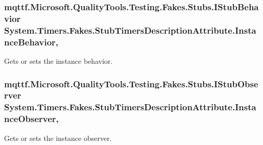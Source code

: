 \hypertarget{class_system_1_1_timers_1_1_fakes_1_1_stub_timers_description_attribute_ace5a66800ab451876edeee69c8747f80}{
\subsubsection[{Instance\-Behavior}]{\setlength{\rightskip}{0pt plus 5cm}mqttf.\-Microsoft.\-Quality\-Tools.\-Testing.\-Fakes.\-Stubs.\-I\-Stub\-Behavior System.\-Timers.\-Fakes.\-Stub\-Timers\-Description\-Attribute.\-Instance\-Behavior\hspace{0.3cm}{\ttfamily [get]}, {\ttfamily [set]}}}\label{class_system_1_1_timers_1_1_fakes_1_1_stub_timers_description_attribute_ace5a66800ab451876edeee69c8747f80}


Gets or sets the instance behavior.

\hypertarget{class_system_1_1_timers_1_1_fakes_1_1_stub_timers_description_attribute_af45f7ab914df9cf362dbd1766e6999e5}{
\subsubsection[{Instance\-Observer}]{\setlength{\rightskip}{0pt plus 5cm}mqttf.\-Microsoft.\-Quality\-Tools.\-Testing.\-Fakes.\-Stubs.\-I\-Stub\-Observer System.\-Timers.\-Fakes.\-Stub\-Timers\-Description\-Attribute.\-Instance\-Observer\hspace{0.3cm}{\ttfamily [get]}, {\ttfamily [set]}}}\label{class_system_1_1_timers_1_1_fakes_1_1_stub_timers_description_attribute_af45f7ab914df9cf362dbd1766e6999e5}


Gets or sets the instance observer.

